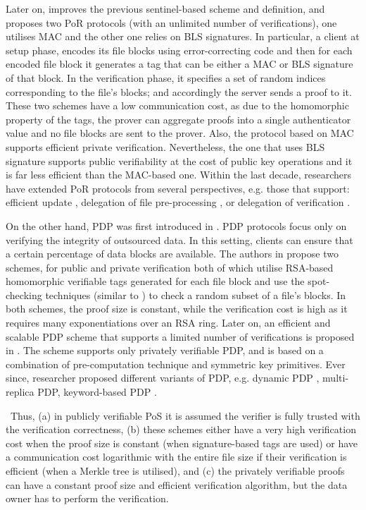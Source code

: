 Later on, \cite{DBLP:conf/asiacrypt/ShachamW08} improves the previous sentinel-based scheme and definition, and proposes two PoR protocols (with an unlimited number of verifications), one utilises  MAC and the other one relies on BLS signatures. In particular, a client at setup phase, encodes its file blocks using error-correcting code and then for each encoded file block it generates a  tag that can be either a MAC or BLS signature of that block. In the verification phase, it specifies a set of random indices corresponding to the file's blocks; and accordingly the server sends a proof to it. These two  schemes have a low communication cost, as due   to the homomorphic property of the tags,  the prover can aggregate  proofs  into a single authenticator value and no file blocks  are sent to the prover. Also, the protocol based on MAC supports efficient private verification. Nevertheless, the one that uses BLS signature supports public verifiability at the cost of public key operations and it is far less efficient than the MAC-based one. Within the  last decade, researchers have extended PoR protocols from several perspectives, e.g. those that support:  efficient update \cite{DBLP:conf/ccs/ShiSP13}, delegation of file pre-processing \cite{ArmknechtBBK16}, or delegation of verification \cite{armknecht2014outsourced}.  


On the other hand, PDP was first introduced in \cite{DBLP:conf/ccs/AtenieseBCHKPS07}. PDP protocols focus only on verifying the  integrity of outsourced data. In this setting,  clients can ensure that a certain percentage of data blocks are available. The authors in \cite{DBLP:conf/ccs/AtenieseBCHKPS07} propose two schemes, for public and private verification both of which utilise RSA-based homomorphic verifiable tags  generated for each file block and use the spot-checking techniques (similar to \cite{DBLP:conf/asiacrypt/ShachamW08}) to check a random subset of a file's blocks. In both schemes, the proof size is constant, while the verification cost is high as it requires  many  exponentiations over an RSA ring. Later on, an  efficient and scalable  PDP scheme that supports a limited number of verifications is proposed in \cite{AteniesePMT08}. The scheme supports only privately verifiable PDP, and is based on a combination of pre-computation technique and symmetric key primitives.  Ever since, researcher proposed different variants of PDP, e.g.  dynamic PDP \cite{ErwayKPT09}, multi-replica PDP\cite{DistributedPDP}, keyword-based PDP \cite{SenguptaR18}.  

\
Thus,  (a) in publicly verifiable PoS it is assumed the verifier is fully trusted with the verification correctness, (b) these schemes either have a very high verification cost when the proof size is constant (when signature-based tags are used) or have a communication cost logarithmic with the entire file size if their verification is efficient (when a Merkle tree is utilised),  and (c) the privately verifiable proofs can have a constant proof size and efficient verification algorithm, but the data owner has to perform the verification. 



